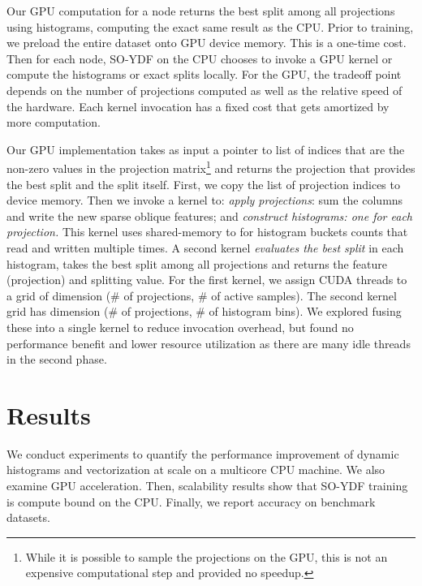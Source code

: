 \documentclass[sigconf]{acmart}
\begin{document}
Our GPU computation for a node returns the best split among all projections using histograms, computing the exact same result as the CPU. Prior to training, we preload the entire dataset onto GPU device memory. This is a one-time cost. Then for each node, SO-YDF on the CPU chooses to invoke a GPU kernel or compute the histograms or exact splits locally.
For the GPU, the tradeoff point depends on the number of projections computed as well as the relative speed of the hardware.
 Each kernel invocation has a fixed cost that gets amortized by more computation. 


Our GPU implementation takes as input a pointer to list of indices that are the non-zero values in the projection matrix\footnote{While it is possible to sample the projections on the GPU, this is not an expensive computational step and provided no speedup.} and returns the projection that provides the best split and the split itself. First, we copy the list of projection indices to device memory. Then we invoke a kernel to:
{\em apply projections}: sum the columns and write the new sparse oblique features; and {\em construct histograms: one for each projection.} This kernel uses shared-memory to for histogram buckets counts that read and written multiple times. 
A second kernel {\em evaluates the best split} in each histogram,
takes the best split among all projections and returns the feature (projection) and splitting value. For the first kernel, we assign CUDA threads to a grid of dimension {\sf (\# of projections, \# of active samples)}. The second kernel grid has dimension {\sf (\# of projections, \# of histogram bins)}.
We explored fusing these into a single kernel to reduce invocation overhead, but found no performance benefit and lower resource utilization as there are many idle threads in the second phase. 



\section{Results}

We conduct experiments to quantify the performance improvement of dynamic histograms and vectorization at scale on a multicore CPU machine. We also examine GPU acceleration. Then, scalability results show that SO-YDF training is compute bound on the CPU. Finally, we report accuracy on benchmark datasets.
\end{document}
